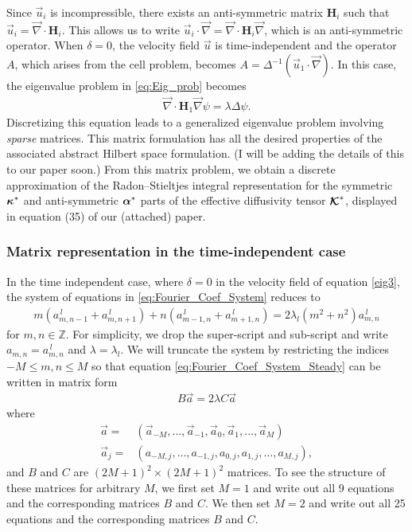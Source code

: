 \documentclass{article}
\newcommand{\Hb}{\mathbf{H}}
\newcommand\bkappa{\mbox{\boldmath${\kappa}$}}
\newcommand\balpha{\mbox{\boldmath${\alpha}$}}
\newcommand\Kbc{\mbox{\boldmath${\mathcal{K}}$}}
\newcommand{\0}{\mathbf{0}}
\newcommand{\1}{\mathbf{1}}
\newcommand{\2}{\mathbf{2}}
\newcommand{\3}{\mathbf{3}}
\newcommand{\4}{\mathbf{4}}
\newcommand{\5}{\mathbf{5}}
\newcommand{\6}{\mathbf{6}}
\newcommand{\7}{\mathbf{7}}
\newcommand{\8}{\mathbf{8}}
\begin{document}
Since $\vec{u}_i$ is incompressible, there exists
an anti-symmetric matrix $\Hb_i$ such that
$\vec{u}_i=\vec{\nabla}\cdot\Hb_i$. This allows us to write
$\vec{u}_i\cdot\vec{\nabla}=\vec{\nabla}\cdot\Hb_i\vec{\nabla}$, which is an anti-symmetric
operator. When $\delta=0$, the velocity field $\vec{u}$ is time-independent
and the operator $A$, which arises from the cell problem, becomes
$A=\Delta^{-1}(\vec{u}_1\cdot\vec{\nabla})$. In this case, the eigenvalue problem in
\eqref{eq:Eig_prob} becomes 
%
\begin{align}\label{eq:Eig_prob_steady}
  \vec{\nabla}\cdot\Hb_1\vec{\nabla}\psi=\lambda\Delta\psi.
\end{align}
%
Discretizing this equation leads to a generalized eigenvalue
problem involving \emph{sparse} matrices. This matrix formulation has
all the desired properties of the associated abstract Hilbert space
formulation. (I will be adding the details of this to our paper soon.)
From this matrix problem, we obtain a discrete approximation of the
Radon--Stieltjes integral representation for the symmetric $\bkappa^*$
and anti-symmetric $\balpha^*$ parts of the effective diffusivity
tensor $\Kbc^*$, displayed in equation (35) of our (attached) paper.  



\subsubsection{Matrix representation in the time-independent case}
%
In the time independent case, where $\delta=0$ in the velocity field of
equation \eqref{eig3}, the system of equations in
\eqref{eq:Fourier_Coef_System} reduces to 
%
\begin{align}\label{eq:Fourier_Coef_System_Steady}
  m(a^{\,l}_{m,n-1}+a^{\,l}_{m,n+1})+n(a^{\,l}_{m-1,n}+a^{\,l}_{m+1,n})=2\lambda_l(m^2+n^2)a^{\,l}_{m,n}
\end{align}
%
for $m,n\in\mathbb{Z}$. For simplicity, we drop the super-script and
sub-script and write $a_{m,n}=a^{\,l}_{m,n}$ and $\lambda=\lambda_l$. We will truncate
the system by restricting the indices $-M\leq m,n\leq M$ so that equation
\eqref{eq:Fourier_Coef_System_Steady} can be written in matrix form
%
\begin{align}
  B\vec{a}=2\lambda C\vec{a}
\end{align}
%
where
%
\begin{align}\label{eq:Coefficient_Vectors}
  \vec{a}=&(\vec{a}_{-M},\ldots,\vec{a}_{-1},\vec{a}_{0},\vec{a}_{1},\ldots,\vec{a}_{M})\\
  \vec{a}_j=&(a_{-M,j},\ldots,a_{-1,j},a_{0,j},a_{1,j},\ldots,a_{M,j}),
\end{align}
% 
and $B$ and $C$ are $(2M+1)^2\times(2M+1)^2$ matrices. To see the structure
of these matrices for arbitrary $M$, we first set $M=1$ and write out
all 9 equations and the corresponding matrices $B$ and $C$. We then
set $M=2$ and write out all 25 equations and the corresponding
matrices $B$ and $C$.      
\newpage
\end{document}
